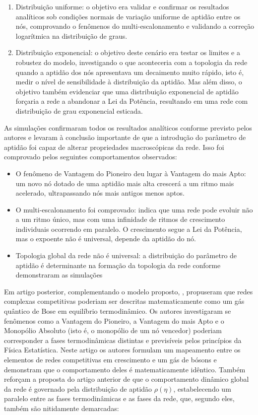 \documentclass[12pt,oneside,a4paper,brazil,sumario=tradicional]{abntex2}
\begin{document}
\begin{enumerate}
  \item Distribuição uniforme: o objetivo era validar e confirmar os resultados analíticos sob condições normais de variação uniforme de aptidão entre os nós, comprovando o fenômenos do multi-escalonamento e validando a correção logarítmica na distribuição de graus.
  \item Distribuição exponencial: o objetivo deste cenário era testar os limites e a robustez do modelo, investigando o que aconteceria com a topologia da rede quando a aptidão dos nós apresentava um decaimento muito rápido, isto é, medir o nível de sensibilidade à distribuição da aptidão. Mas além disso, o objetivo também evidenciar que uma distribuição exponencial de aptidão forçaria a rede a abandonar a Lei da Potência, resultando em uma rede com distribuição de grau exponencial esticada.
\end{enumerate}
As simulações confirmaram todos os resultados analíticos conforme previsto pelos autores e levaram à conclusão importante de que a introdução do parâmetro de aptidão foi capaz de alterar propriedades macroscópicas da rede. Isso foi comprovado pelos seguintes comportamentos observados:

\begin{itemize}
  \item O fenômeno de Vantagem do Pioneiro deu lugar à Vantagem do mais Apto: um novo nó dotado de uma aptidão mais alta crescerá a um ritmo mais acelerado, ultrapassando nós mais antigos  menos aptos.
\end{itemize}
\begin{itemize}
  \item O multi-escalonamento foi comprovado: indica que uma rede pode evoluir não a um ritmo único, mas com uma infinidade de ritmos de crescimento individuais ocorrendo  em paralelo. O crescimento segue a Lei da Potência, mas o expoente não é universal, depende da aptidão do nó.
  \item Topologia global da rede não é universal: a distribuição do parâmetro de aptidão é determinante na formação da topologia da rede conforme demonstraram as simulações
\end{itemize}
Em artigo posterior, complementando o modelo proposto, , propuseram que redes complexas competitivas poderiam ser descritas matematicamente como um gás quântico de Bose em equilíbrio termodinâmico. Os autores investigaram se fenômenos como a Vantagem do Pioneiro, a Vantagem do mais Apto e o Monopólio Absoluto (isto é, o monopólio de um nó vencedor) poderiam corresponder a fases termodinâmicas distintas e previsíveis pelos princípios da Física Estatística. Neste artigo os autores formulam um mapeamento entre os elementos de redes competitivas em crescimento e um gás de bósons e demonstram que o comportamento deles é matematicamente idêntico. Também reforçam a proposta do artigo anterior de que o comportamento dinâmico global da rede é governado pela distribuição de aptidão $\rho(\eta)$, estabelecendo um paralelo entre as fases termodinâmicas e as fases da rede, que, segundo eles, também são nitidamente demarcadas:
\end{document}
